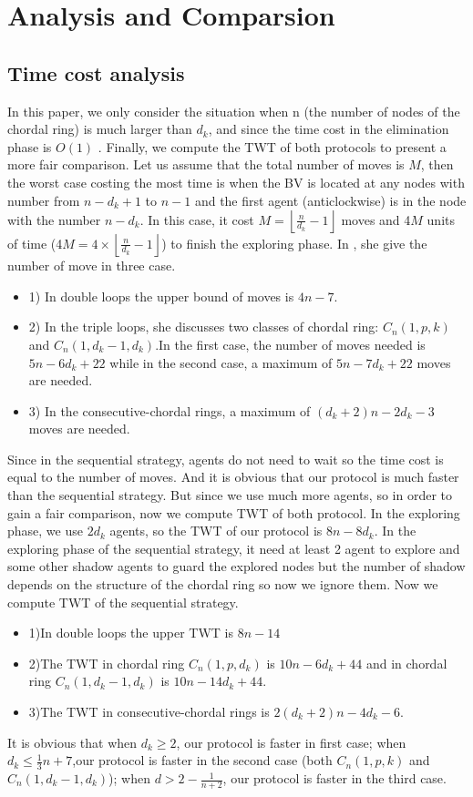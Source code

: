 \section{Analysis and Comparsion}
\subsection{Time cost analysis}
In this paper, we only consider the situation when n (the number of nodes of the chordal ring) is much larger than $d_k$, and since the time cost in the elimination phase is $O(1)$ 	.  Finally, we compute the TWT of both protocols to present a more fair comparison.
Let us assume that the total number of moves is $M$, then the worst case costing the most time is when the BV is located at any nodes with number from $n-d_k+1$ to $n-1$ and the first agent (anticlockwise) is in the node with the number $n-d_k$. In this case, it cost $M=\left \lfloor \frac{n}{d_k}-1\right \rfloor$ moves and 4$M$ units of time (4$M=4\times \left \lfloor \frac{n}{d_k}-1\right \rfloor$) to finish the exploring phase. 
In \cite{EH1}, she give the number of move in three case.
\begin{itemize}
\item 1) In double loops the upper bound of moves is $4n-7$.
\item 2) In the triple loops, she discusses two classes of chordal ring: $C_n(1,p,k)$ and $C_n(1,d_k-1,d_k)$.In the first case, the number of moves needed is $5n-6d_k+22$ while in the second case, a maximum of $5n-7d_k+22$ moves are needed.
\item 3) In the consecutive-chordal rings, a maximum of $(d_k+2)n-2d_k-3$ moves are needed.
\end{itemize}
Since in the sequential strategy, agents do not need to wait so the time cost is equal to the number of moves. And it is obvious that our protocol is much faster than the sequential strategy. But since we use much more agents, so in order to gain a fair comparison, now we compute TWT of both protocol.
In the exploring phase, we use $2d_k$ agents, so the TWT of our protocol is $8n-8d_k$. In the exploring phase of the sequential strategy, it need at least 2 agent to explore and some other shadow agents to guard the explored nodes but the number of shadow depends on the structure of the chordal ring so now we ignore them. Now we compute TWT of the sequential strategy.
\begin{itemize}
\item 1)In double loops the upper TWT is $8n-14$
\item 2)The TWT in chordal ring $C_n(1,p,d_k)$ is $10n-6d_k+44$ and in chordal ring $C_n(1,d_k-1,d_k)$ is $10n-14d_k+44$.
\item 3)The TWT in consecutive-chordal rings is $2(d_k+2)n-4d_k-6$.
\end{itemize}
It is obvious that when $d_k\geq 2$, our protocol is faster in first case; when $d_k\leq \frac{1}{3}n+7$,our protocol is faster in the second case (both $C_n(1,p,k)$ and $C_n(1,d_k-1,d_k)$); when $d>2-\frac{1}{n+2}$, our protocol is faster in the third case.

